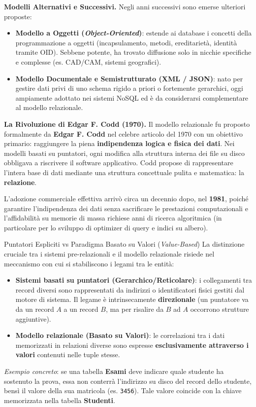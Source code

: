 \documentclass[12pt]{extarticle}
\begin{document}
\medskip
\noindent \textbf{Modelli Alternativi e Successivi.} Negli anni successivi sono emerse ulteriori proposte:
\begin{itemize}
    \item \textbf{Modello a Oggetti (\textit{Object-Oriented})}: estende ai database i concetti della programmazione a oggetti (incapsulamento, metodi, ereditarietà, identità tramite OID). Sebbene potente, ha trovato diffusione solo in nicchie specifiche e complesse (es. CAD/CAM, sistemi geografici).
    \item \textbf{Modello Documentale e Semistrutturato (XML / JSON)}: nato per gestire dati privi di uno schema rigido a priori o fortemente gerarchici, oggi ampiamente adottato nei sistemi NoSQL ed è da considerarsi complementare al modello relazionale.
\end{itemize}

\medskip
\noindent \textbf{La Rivoluzione di Edgar F. Codd (1970).} Il modello relazionale fu proposto formalmente da \textbf{Edgar F. Codd} nel celebre articolo del 1970 con un obiettivo primario: raggiungere la piena \textbf{indipendenza logica e fisica dei dati}. Nei modelli basati su puntatori, ogni modifica alla struttura interna dei file su disco obbligava a riscrivere il software applicativo. Codd propose di rappresentare l'intera base di dati mediante una struttura concettuale pulita e matematica: la \textbf{relazione}.

\medskip
\noindent L'adozione commerciale effettiva arrivò circa un decennio dopo, nel \textbf{1981}, poiché garantire l'indipendenza dei dati senza sacrificare le prestazioni computazionali e l'affidabilità su memorie di massa richiese anni di ricerca algoritmica (in particolare per lo sviluppo di optimizer di query e indici su albero).

\begin{cbox}{Puntatori Espliciti vs Paradigma Basato su Valori (\textit{Value-Based})}
\noindent La distinzione cruciale tra i sistemi pre-relazionali e il modello relazionale risiede nel meccanismo con cui si stabiliscono i legami tra le entità:
\begin{itemize}
    \item \textbf{Sistemi basati su puntatori (Gerarchico/Reticolare)}: i collegamenti tra record diversi sono rappresentati da indirizzi o identificatori fisici gestiti dal motore di sistema. Il legame è intrinsecamente \textbf{direzionale} (un puntatore va da un record $A$ a un record $B$, ma per risalire da $B$ ad $A$ occorrono strutture aggiuntive).
    \item \textbf{Modello relazionale (Basato su Valori)}: le correlazioni tra i dati memorizzati in relazioni diverse sono espresse \textbf{esclusivamente attraverso i valori} contenuti nelle tuple stesse.
\end{itemize}
\medskip
\noindent \textit{Esempio concreto}: se una tabella \textbf{Esami} deve indicare quale studente ha sostenuto la prova, essa non conterrà l'indirizzo su disco del record dello studente, bensì il valore della sua matricola (es. \texttt{3456}). Tale valore coincide con la chiave memorizzata nella tabella \textbf{Studenti}.
\end{cbox}
\end{document}
